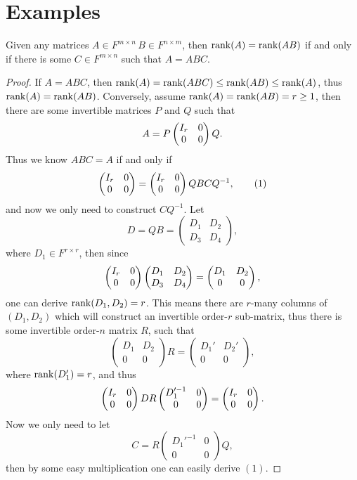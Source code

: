\section{Examples}
\begin{pro}%
	Given any matrices $A\in F^{m\times n}\, B\in F^{n\times m}$, then $\operatorname*{rank}(A)=\operatorname*{rank} (AB)$ if and only if there is some $C\in F^{m\times n}$ such that $A=ABC$.
\end{pro}
\begin{proof}
	If $A=ABC$, then $\operatorname*{rank}(A)=\operatorname*{rank}(ABC)\leq \operatorname*{rank} (AB)\leq \operatorname*{rank} (A)$, thus $\operatorname*{rank} (A)=\operatorname*{rank} (AB)$. Conversely, assume $\operatorname*{rank} (A)=\operatorname*{rank}(AB)=r\geq 1$, then there are some invertible matrices $P$ and $Q$ such that 
	\[A=P\begin{pmatrix} I_{r}& 0\\ 0 & 0 \end{pmatrix}Q.\]
	Thus we know $ABC=A$ if and only if 
	\[\begin{pmatrix} I_{r}& 0\\ 0 & 0 \end{pmatrix}=\begin{pmatrix} I_{r}& 0\\ 0 & 0 \end{pmatrix}QBCQ^{-1},\tag{1}\]
	and now we only need to construct $CQ^{-1}$. Let 
	\[D=QB=\begin{pmatrix} D_1 & D_2\\ D_3 & D_4\end{pmatrix},\]
	where $D_1\in F^{r\times r}$, then since  
	\[\begin{pmatrix} I_{r}& 0\\ 0 & 0 \end{pmatrix}\begin{pmatrix} D_1 & D_2\\ D_3 & D_4\end{pmatrix}=
	\begin{pmatrix} D_1 & D_2\\ 0 & 0\end{pmatrix},\] 
	one can derive $\operatorname*{rank} (D_1,D_2)=r$. This means there are $r$-many columns of $(D_1,D_2)$ which will construct an invertible order-$r$ sub-matrix, thus there is some invertible order-$n$ matrix $R$, such that 
	\[\begin{pmatrix} D_1 & D_2\\ 0 & 0\end{pmatrix}R=\begin{pmatrix} D_1' & D_2'\\ 0 & 0\end{pmatrix},\]
	where $\operatorname*{rank}(D_1')=r$, and thus 
	\[\begin{pmatrix} I_{r}& 0\\ 0 & 0 \end{pmatrix}DR\begin{pmatrix}D_1'^{-1} & 0\\ 0 & 0 \end{pmatrix}=\begin{pmatrix} I_{r}& 0\\ 0 & 0 \end{pmatrix}.\]
	Now we only need to let 
	\[C=R\begin{pmatrix}D_1'^{-1} & 0\\ 0 & 0 \end{pmatrix} Q,\]
	then by some easy multiplication one can easily derive $(1)$.
\end{proof}

